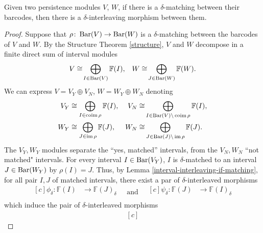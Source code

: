 \begin{proposition} \cite[Theorem 3.0.1]{polterovich} \label{prop:interleaving-if-matching} 
    Given two persistence modules $ V $, $ W $, if there is a $ \delta$-matching between their barcodes, then there is a $ \delta$-interleaving morphism between them.
\end{proposition}
\begin{proof}
    Suppose that $\rho\colon \operatorname{Bar} (V) \to \operatorname{Bar} (W) $ is a $\delta$-matching between the barcodes of $ V $ and $ W $. By the Structure Theorem \ref{structure}, $ V $ and $ W $ decompose in a finite direct sum of interval modules
    \begin{align}
        V \cong \! \bigoplus_{I \in \operatorname{Bar} (V)} \mathbb F (I),& &W \cong \! \bigoplus_{J \in  \operatorname{Bar} (W)} \mathbb F (W) .
    \end{align}
    We can express $ V = V_Y \oplus V_N $, $ W = W_Y \oplus W_N $ denoting
    \begin{align}
        V_Y &\cong \bigoplus_{I \in  \operatorname{coim} \rho} \mathbb F (I),& V_N \cong &\bigoplus_{I \in \operatorname{Bar}(V) \backslash \operatorname{coim} \rho} \mathbb F (I),\\
        W_Y &\cong \bigoplus_{J \in  \operatorname{im} \rho} \mathbb F (J),& W_N \cong &\bigoplus_{J \in \operatorname{Bar}(J) \backslash \operatorname{im} \rho} \mathbb F (J).
    \end{align}
    The $ V_Y, W_Y $ modules separate the ``yes, matched'' intervals, from the $ V_N, W_N $ ``not matched" intervals. For every interval $ I \in \operatorname{Bar}(V_Y) $, $ I $ is $\delta$-matched to an interval $ J \in \operatorname{Bar}(W_Y)$ by $\rho(I) = J $. Thus, by Lemma \ref{interval-interleaving-if-matching}, for all pair $ I, J $ of matched intervals, there exist a par of $\delta$-interleaved morphisms
    \begin{equation*}
        \begin{aligned}[c]
        \phi_\delta\colon \mathbb F(I) &\to \mathbb F(J)_\delta\\
        \end{aligned}
        \quad \text{and} \quad
        \begin{aligned}[c]
        \psi_\delta\colon \mathbb F(J) &\to \mathbb F(I)_\delta\\
        \end{aligned}
    \end{equation*}
    which induce the pair of $\delta$-interleaved morphisms
    \begin{equation*}
        \begin{aligned}[c]

\end{aligned}
\end{equation*}
\end{proof}

